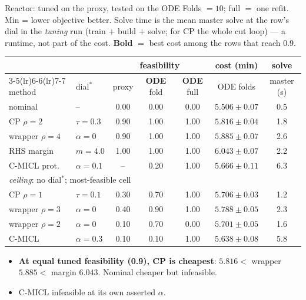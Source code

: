 \documentclass{beamer}
\begin{document}
\begin{frame}{Reactor: tuned on the proxy, tested on the ODE}
    \scriptsize
    Folds $=10$; full $=$ one refit. Min = lower objective better.
    Solve time is the mean master solve at the row's dial in the \emph{tuning}
    run (train $+$ build $+$ solve; for CP the whole cut loop) --- a runtime,
    not part of the cost.
    \textbf{Bold} $=$ best cost among the rows that reach $0.9$.
    {\scriptsize\setlength{\tabcolsep}{3pt}
    \begin{tabular}{llccc|c|c}
        \toprule
        & & \multicolumn{3}{c|}{feasibility} & cost (min) & solve \\
        \cmidrule(lr){3-5}\cmidrule(lr){6-6}\cmidrule(lr){7-7}
        method & dial$^\ast$ & proxy & \textbf{ODE} fold & \textbf{ODE} full
               & ODE folds & master (s) \\
        \midrule
        nominal            & --           & 0.00 & 0.00 & 0.00
                           & $5.506\pm0.07$ & 0.5 \\
        CP $\rho{=}2$      & $\tau=0.3$   & 0.90 & 1.00 & 1.00
                           & $\mathbf{5.816}\pm0.04$ & 1.8 \\
        wrapper $\rho{=}4$ & $\alpha=0$   & 0.90 & 1.00 & 1.00
                           & $5.885\pm0.07$ & 2.6 \\
        RHS margin         & $m=4.0$      & 1.00 & 1.00 & 1.00
                           & $6.043\pm0.07$ & 2.2 \\
        C-MICL prot.       & $\alpha=0.1$ & --   & 0.20 & 1.00
                           & $5.666\pm0.11$ & 6.3 \\
        \midrule
        \multicolumn{7}{l}{\emph{ceiling}: no dial$^\ast$; most-feasible cell} \\
        CP $\rho{=}1$      & $\tau=0.1$   & 0.30 & 0.70 & 1.00 & $5.706\pm0.03$ & 1.2 \\
        wrapper $\rho{=}3$ & $\alpha=0$   & 0.40 & 0.90 & 1.00 & $5.788\pm0.05$ & 2.3 \\
        wrapper $\rho{=}2$ & $\alpha=0$   & 0.10 & 0.70 & 0.00 & $5.701\pm0.05$ & 1.6 \\
        C-MICL             & $\alpha=0.3$ & 0.10 & 0.10 & 1.00 & $5.638\pm0.08$ & 5.8 \\
        \bottomrule
    \end{tabular}}
    \begin{itemize}\scriptsize
        \item \textbf{At equal tuned feasibility (0.9), CP is cheapest}:
              $5.816 <$ wrapper $5.885 <$ margin $6.043$. Nominal cheaper but infeasible.
        \item C-MICL infeasible at its own asserted $\alpha$.
    \end{itemize}
\end{frame}
\end{document}
